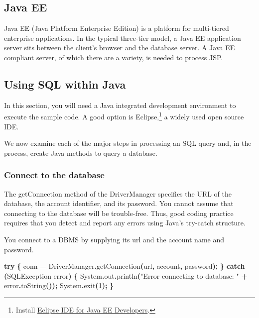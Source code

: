 \documentclass[
]{article}
\newenvironment{Shaded}{\begin{snugshade}}{\end{snugshade}}
\newcommand{\BuiltInTok}[1]{#1}
\newcommand{\ControlFlowTok}[1]{\textcolor[rgb]{0.13,0.29,0.53}{\textbf{#1}}}
\newcommand{\DecValTok}[1]{\textcolor[rgb]{0.00,0.00,0.81}{#1}}
\newcommand{\FunctionTok}[1]{\textcolor[rgb]{0.00,0.00,0.00}{#1}}
\newcommand{\NormalTok}[1]{#1}
\newcommand{\OperatorTok}[1]{\textcolor[rgb]{0.81,0.36,0.00}{\textbf{#1}}}
\newcommand{\StringTok}[1]{\textcolor[rgb]{0.31,0.60,0.02}{#1}}
\begin{document}
\hypertarget{java-ee}{%
\subsection*{Java EE}\label{java-ee}}

Java EE (Java Platform Enterprise Edition) is a platform for
multi-tiered enterprise applications. In the typical three-tier model, a
Java EE application server sits between the client's browser and the
database server. A Java EE compliant server, of which there are a
variety, is needed to process JSP.

\hypertarget{using-sql-within-java}{%
\subsection*{Using SQL within Java}\label{using-sql-within-java}}

In this section, you will need a Java integrated development environment
to execute the sample code. A good option is Eclipse,\footnote{Install \underline{Eclipse IDE for Java EE Developers}.} a widely used
open source IDE.

We now examine each of the major steps in processing an SQL query and,
in the process, create Java methods to query a database.

\hypertarget{connect-to-the-database}{%
\subsubsection*{Connect to the database}\label{connect-to-the-database}}

The getConnection method of the DriverManager specifies the URL of the
database, the account identifier, and its password. You cannot assume
that connecting to the database will be trouble-free. Thus, good coding
practice requires that you detect and report any errors using Java's
try-catch structure.

You connect to a DBMS by supplying its url and the account name and
password.

\begin{Shaded}
\begin{Highlighting}[]
\ControlFlowTok{try} \OperatorTok{\{}
\NormalTok{    conn }\OperatorTok{=} \BuiltInTok{DriverManager}\OperatorTok{.}\FunctionTok{getConnection}\OperatorTok{(}\NormalTok{url}\OperatorTok{,}\NormalTok{ account}\OperatorTok{,}\NormalTok{ password}\OperatorTok{);}
\OperatorTok{\}} \ControlFlowTok{catch} \OperatorTok{(}\BuiltInTok{SQLException}\NormalTok{ error}\OperatorTok{)} \OperatorTok{\{}
    \BuiltInTok{System}\OperatorTok{.}\FunctionTok{out}\OperatorTok{.}\FunctionTok{println}\OperatorTok{(}\StringTok{"Error connecting to database: "} \OperatorTok{+}\NormalTok{ error}\OperatorTok{.}\FunctionTok{toString}\OperatorTok{());}
    \BuiltInTok{System}\OperatorTok{.}\FunctionTok{exit}\OperatorTok{(}\DecValTok{1}\OperatorTok{);}
\OperatorTok{\}}
\end{Highlighting}
\end{Shaded}
\end{document}
